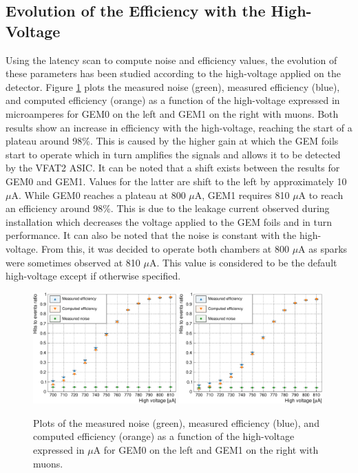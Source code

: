     \subsection{Evolution of the Efficiency with the High-Voltage}

      Using the latency scan to compute noise and efficiency values, the evolution of these parameters has been studied according to the high-voltage applied on the detector. Figure \ref{fig:II-3-data-eff-hv} plots the measured noise (green), measured efficiency (blue), and computed efficiency (orange) as a function of the high-voltage expressed in microamperes for GEM0 on the left and GEM1 on the right with muons. Both results show an increase in efficiency with the high-voltage, reaching the start of a plateau around 98\%. This is caused by the higher gain at which the GEM foils start to operate which in turn amplifies the signals and allows it to be detected by the VFAT2 ASIC. It can be noted that a shift exists between the results for GEM0 and GEM1. Values for the latter are shift to the left by approximately 10 $\mu$A. While GEM0 reaches a plateau at 800 $\mu$A, GEM1 requires 810 $\mu$A to reach an efficiency around 98\%. This is due to the leakage current observed during installation which decreases the voltage applied to the GEM foils and in turn performance. It can also be noted that the noise is constant with the high-voltage. From this, it was decided to operate both chambers at 800 $\mu$A as sparks were sometimes observed at 810 $\mu$A. This value is considered to be the default high-voltage except if otherwise specified. \\

      \begin{figure}[h!]
        \centering
        \includegraphics[width=0.49\textwidth]{img/plots/cEfficiency_HV_GEM0-crop}
        \includegraphics[width=0.49\textwidth]{img/plots/cEfficiency_HV_GEM1-crop}
        \caption{Plots of the measured noise (green), measured efficiency (blue), and computed efficiency (orange) as a function of the high-voltage expressed in $\mu$A for GEM0 on the left and GEM1 on the right with muons.}
        \label{fig:II-3-data-eff-hv}
      \end{figure}

